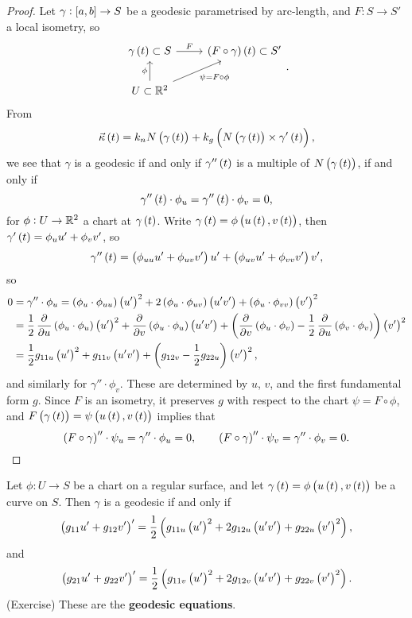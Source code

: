 \begin{proof}
Let $ \gamma : \sbr{a, b} \to S $ be a geodesic parametrised by arc-length, and $ F : S \to S' $ a local isometry, so
$$
\begin{tikzcd}
\gamma\br{t} \subset S \arrow{r}{F} & \br{F \circ \gamma}\br{t} \subset S' \\
U \subset \R^2 \arrow{u}{\phi} \arrow[swap]{ur}{\psi = F \circ \phi}
\end{tikzcd}.
$$
From
$$ \vec{\kappa}\br{t} = k_nN\br{\gamma\br{t}} + k_g\br{N\br{\gamma\br{t}} \times \gamma'\br{t}}, $$
we see that $ \gamma $ is a geodesic if and only if $ \gamma''\br{t} $ is a multiple of $ N\br{\gamma\br{t}} $, if and only if
$$ \gamma''\br{t} \cdot \phi_u = \gamma''\br{t} \cdot \phi_v = 0, $$
for $ \phi : U \to \mathbb{R}^2 $ a chart at $ \gamma\br{t} $. Write $ \gamma\br{t} = \phi\br{u\br{t}, v\br{t}} $, then $ \gamma'\br{t} = \phi_uu' + \phi_vv' $, so
$$ \gamma''\br{t} = \br{\phi_{uu}u' + \phi_{uv}v'}u' + \br{\phi_{uv}u' + \phi_{vv}v'}v', $$
so
\begin{align*}
0
& = \gamma'' \cdot \phi_u
= \br{\phi_u \cdot \phi_{uu}}\br{u'}^2 + 2\br{\phi_u \cdot \phi_{uv}}\br{u'v'} + \br{\phi_u \cdot \phi_{vv}}\br{v'}^2 \\
& = \dfrac{1}{2}\dpd{}{u}\br{\phi_u \cdot \phi_u}\br{u'}^2 + \dpd{}{v}\br{\phi_u \cdot \phi_u}\br{u'v'} + \br{\dpd{}{v}\br{\phi_u \cdot \phi_v} - \dfrac{1}{2}\dpd{}{u}\br{\phi_v \cdot \phi_v}}\br{v'}^2 \\
& = \dfrac{1}{2}g_{11u}\br{u'}^2 + g_{11v}\br{u'v'} + \br{g_{12v} - \dfrac{1}{2}g_{22u}}\br{v'}^2,
\end{align*}
and similarly for $ \gamma'' \cdot \phi_v $. These are determined by $ u $, $ v $, and the first fundamental form $ g $. Since $ F $ is an isometry, it preserves $ g $ with respect to the chart $ \psi = F \circ \phi $, and $ F\br{\gamma\br{t}} = \psi\br{u\br{t}, v\br{t}} $ implies that
$$ \br{F \circ \gamma}'' \cdot \psi_u = \gamma'' \cdot \phi_u = 0, \qquad \br{F \circ \gamma}'' \cdot \psi_v = \gamma'' \cdot \phi_v = 0. $$
\end{proof}

Let $ \phi : U \to S $ be a chart on a regular surface, and let $ \gamma\br{t} = \phi\br{u\br{t}, v\br{t}} $ be a curve on $ S $. Then $ \gamma $ is a geodesic if and only if
$$ \br{g_{11}u' + g_{12}v'}' = \dfrac{1}{2}\br{g_{11u}\br{u'}^2 + 2g_{12u}\br{u'v'} + g_{22u}\br{v'}^2}, $$
and
$$ \br{g_{21}u' + g_{22}v'}' = \dfrac{1}{2}\br{g_{11v}\br{u'}^2 + 2g_{12v}\br{u'v'} + g_{22v}\br{v'}^2}. $$
(Exercise) These are the \textbf{geodesic equations}.

